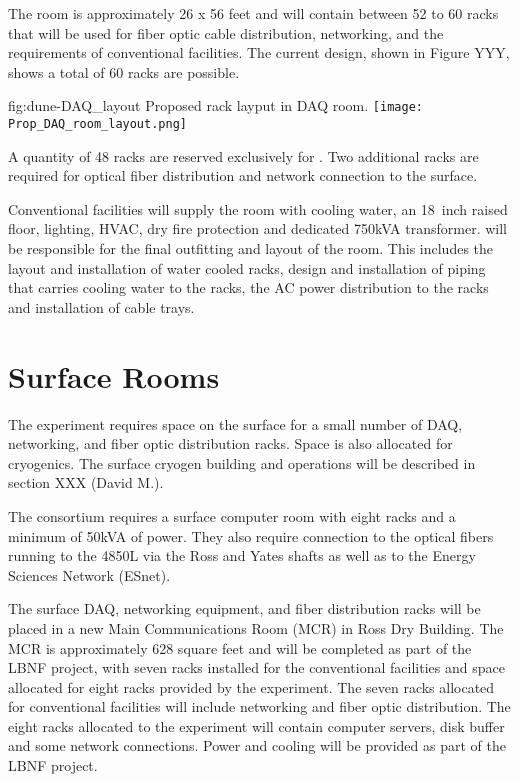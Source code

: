 The  room is approximately 26 x 56 feet and will contain between 52 to 60 racks that will be
used for fiber optic cable distribution, networking, 
 and the requirements of conventional facilities.  The current design, shown in Figure YYY, shows a total of 60 racks are possible.

\begin{dunefigure}{fig:dune-DAQ_layout}
  {Proposed rack layput in DAQ room.}
  \texttt{[image: Prop\_DAQ\_room\_layout.png]}
\end{dunefigure}
  

A quantity of 48 racks are reserved exclusively for .  Two additional racks are required for optical fiber distribution and network connection to the surface.

Conventional facilities will supply the  room with cooling
water, an 18~inch raised floor, lighting, HVAC, dry fire protection
and dedicated 750kVA transformer.   will be responsible for
the final outfitting and layout of the room.  This includes the layout
and installation of water cooled racks, design and installation of
piping that carries cooling water to the racks, the AC power
distribution to the racks and installation of cable trays.

\section{Surface Rooms}
\label{sec:fdsp-coord-surf-rooms}

The  experiment requires space on the surface for a small number of DAQ, networking, and fiber optic distribution racks.  Space is also allocated for cryogenics.  The surface cryogen building and operations will be described in section XXX (David M.).

The  consortium requires a surface computer room with eight
racks and a minimum of 50kVA of power.  They also require connection
to the optical fibers running to the 4850L via the Ross and Yates shafts as well as to the Energy Sciences Network (ESnet).

The surface DAQ, networking equipment, and fiber distribution racks will be placed in a new Main Communications Room (MCR) in Ross Dry Building.  The MCR is approximately 628 square feet and will be completed as part of the LBNF project, with seven racks installed for the conventional facilities and space allocated for eight racks provided by the experiment.  The seven racks allocated for conventional facilities will include networking and fiber optic distribution.  The eight racks allocated to the experiment will contain computer servers, disk buffer and some network connections.  Power and cooling will be provided as part of the LBNF project.

